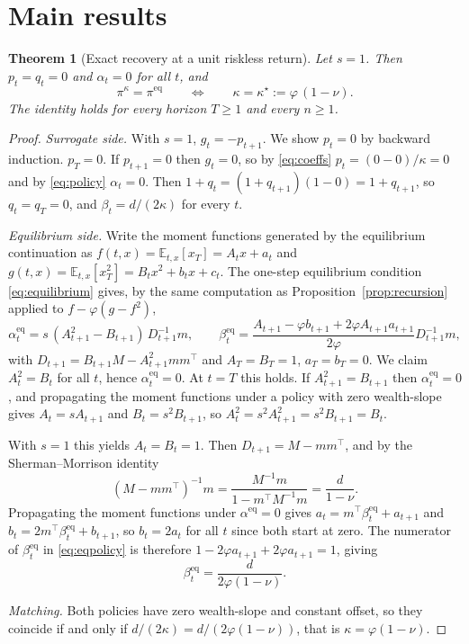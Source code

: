 \documentclass[11pt,a4paper]{article}
\theoremstyle{plain}
\newtheorem{theorem}{Theorem}
\theoremstyle{definition}
\theoremstyle{remark}
\newcommand{\E}{\mathbb{E}}
\newcommand{\pieq}{\pi^{\mathrm{eq}}}
\newcommand{\pir}{\pi^{\kappa}}
\begin{document}
\section{Main results}\label{sec:main}

\begin{theorem}[Exact recovery at a unit riskless return]\label{thm:main}
Let $s=1$. Then $p_t=q_t=0$ and $\alpha_t=0$ for all $t$, and
\[
\pir=\pieq
\qquad\Longleftrightarrow\qquad
\kappa=\kappa^{\star}:=\varphi\,(1-\nu).
\]
The identity holds for every horizon $T\ge1$ and every $n\ge1$.
\end{theorem}

\begin{proof}
\emph{Surrogate side.} With $s=1$, $g_t=-p_{t+1}$. We show $p_t=0$ by backward
induction. $p_T=0$. If $p_{t+1}=0$ then $g_t=0$, so by \eqref{eq:coeffs}
$p_t=(0-0)/\kappa=0$ and by \eqref{eq:policy} $\alpha_t=0$. Then
$1+q_t=(1+q_{t+1})(1-0)=1+q_{t+1}$, so $q_t=q_T=0$, and
$\beta_t=d/(2\kappa)$ for every $t$.

\emph{Equilibrium side.} Write the moment functions generated by the equilibrium
continuation as $f(t,x)=\E_{t,x}[x_T]=A_tx+a_t$ and
$g(t,x)=\E_{t,x}[x_T^2]=B_tx^2+b_tx+c_t$. The one-step equilibrium condition
\eqref{eq:equilibrium} gives, by the same computation as
Proposition~\ref{prop:recursion} applied to $f-\varphi(g-f^2)$,
\begin{equation}
\alpha^{\mathrm{eq}}_t=s\,(A_{t+1}^2-B_{t+1})\,D_{t+1}^{-1}m,\qquad
\beta^{\mathrm{eq}}_t=\frac{A_{t+1}-\varphi b_{t+1}+2\varphi A_{t+1}a_{t+1}}{2\varphi}
D_{t+1}^{-1}m,
\label{eq:eqpolicy}
\end{equation}
with $D_{t+1}=B_{t+1}M-A_{t+1}^2mm^{\top}$ and $A_T=B_T=1$, $a_T=b_T=0$.
We claim $A_t^2=B_t$ for all $t$, hence $\alpha^{\mathrm{eq}}_t=0$. At $t=T$ this
holds. If $A_{t+1}^2=B_{t+1}$ then $\alpha^{\mathrm{eq}}_t=0$, and propagating the
moment functions under a policy with zero wealth-slope gives $A_t=sA_{t+1}$ and
$B_t=s^2B_{t+1}$, so $A_t^2=s^2A_{t+1}^2=s^2B_{t+1}=B_t$.

With $s=1$ this yields $A_t=B_t=1$. Then
$D_{t+1}=M-mm^{\top}$, and by the Sherman--Morrison identity
\[
(M-mm^{\top})^{-1}m=\frac{M^{-1}m}{1-m^{\top}M^{-1}m}=\frac{d}{1-\nu}.
\]
Propagating the moment functions under $\alpha^{\mathrm{eq}}=0$ gives
$a_t=m^{\top}\beta^{\mathrm{eq}}_t+a_{t+1}$ and
$b_t=2m^{\top}\beta^{\mathrm{eq}}_t+b_{t+1}$, so $b_t=2a_t$ for all $t$ since both
start at zero. The numerator of $\beta^{\mathrm{eq}}_t$ in \eqref{eq:eqpolicy} is
therefore $1-2\varphi a_{t+1}+2\varphi a_{t+1}=1$, giving
\[
\beta^{\mathrm{eq}}_t=\frac{d}{2\varphi(1-\nu)} .
\]

\emph{Matching.} Both policies have zero wealth-slope and constant offset, so
they coincide if and only if $d/(2\kappa)=d/(2\varphi(1-\nu))$, that is
$\kappa=\varphi(1-\nu)$.
\end{proof}
\end{document}
